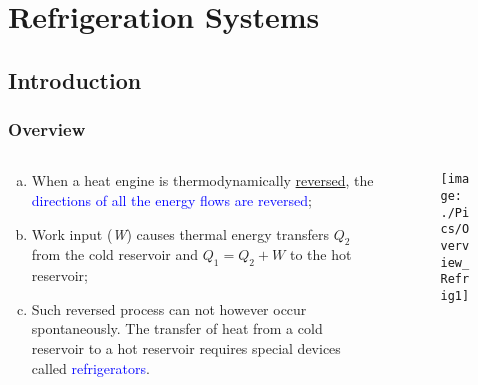\documentclass[10pt,compress,handout,unknownkeysallowed]{beamer}
\begin{document}
\section{Refrigeration Systems}

\subsection{Introduction}

\begin{frame}
 \frametitle{Overview}
  \begin{columns}
   \begin{column}[c]{0.45\linewidth}
    \begin{enumerate}[(a)] 
     \item <1-> When a heat engine is thermodynamically \underline{reversed}, the \textcolor{blue}{directions of all the energy flows are reversed};
     \item <2-> Work input ({\it W}) causes thermal energy transfers $Q_{2}$ from the cold reservoir and $Q_{1}=Q_{2}+W$ to the hot reservoir; 
     \item <3-> Such reversed process can not however occur spontaneously. The transfer of heat from a cold reservoir to a hot reservoir requires special devices called \textcolor{blue}{refrigerators}.
    \end{enumerate}
   \end{column}
   \begin{column}[c]{0.55\linewidth}
    \begin{figure}%
     \begin{center}
      \texttt{[image: ./Pics/Overview\_Refrig1]}
     \end{center}
    \end{figure}  
   \end{column}  
  \end{columns}
\end{frame}
\end{document}
